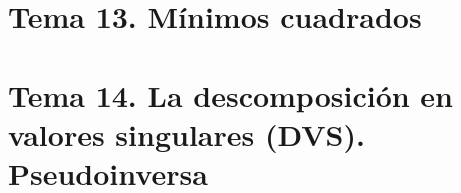 \documentclass[12pt, twoside, openright]{report} %
\begin{document}
\part{Tema 13. Mínimos cuadrados}





\part{Tema 14. La descomposición en valores singulares (DVS). Pseudoinversa}




\end{document}
